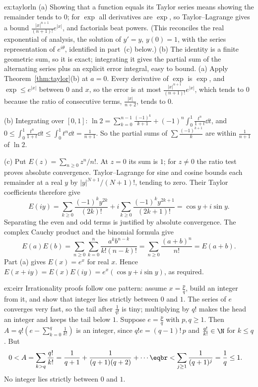 \begin{solution}{ex:taylorln}
\idea (a) Showing that a function equals its Taylor series means showing the remainder tends to $0$; for $\exp$ all derivatives are $\exp$, so Taylor--Lagrange gives a bound $\frac{|x|^{n+1}}{(n+1)!}e^{|x|}$, and factorials beat powers. (This reconciles the real exponential of analysis, the solution of $y'=y$, $y(0)=1$, with the series representation of $e^{i\theta}$, identified in part~(c) below.) (b) The identity is a finite geometric sum, so it is exact; integrating it gives the partial sum of the alternating series plus an explicit error integral, easy to bound.
\writeup (a) Apply Theorem~\ref{thm:taylor}(b) at $a=0$. Every derivative of $\exp$ is $\exp$, and $\exp\le e^{|x|}$ between $0$ and $x$, so the error is at most $\frac{|x|^{n+1}}{(n+1)!}e^{|x|}$, which tends to $0$ because the ratio of consecutive terms, $\frac{|x|}{n+2}$, tends to $0$.

(b) Integrating over $[0,1]$: $\ln2=\sum_{k=0}^{n-1}\frac{(-1)^k}{k+1}+(-1)^n\int_0^1\frac{t^n}{1+t}\dd t$, and
$0\le\int_0^1\frac{t^n}{1+t}\dd t\le\int_0^1t^n\dd t=\frac1{n+1}$. So the partial sums of $\sum\frac{(-1)^{k+1}}k$ are within $\frac1{n+1}$ of $\ln2$.

(c) Put $E(z)=\sum_{n\ge0}z^n/n!$. At $z=0$ its sum is $1$; for $z\ne0$ the ratio test proves absolute convergence.
Taylor--Lagrange for sine and cosine bounds each remainder at a real $y$ by
$|y|^{N+1}/(N+1)!$, tending to zero. Their Taylor coefficients therefore give
\[
E(iy)=\sum_{k\ge0}\frac{(-1)^k y^{2k}}{(2k)!}
+i\sum_{k\ge0}\frac{(-1)^k y^{2k+1}}{(2k+1)!}
=\cos y+i\sin y.
\]
Separating the even and odd terms is justified by absolute convergence.
The complex Cauchy product and the binomial formula give
\[
E(a)E(b)=\sum_{n\ge0}\sum_{k=0}^n
\frac{a^kb^{n-k}}{k!(n-k)!}
=\sum_{n\ge0}\frac{(a+b)^n}{n!}=E(a+b).
\]
Part (a) gives $E(x)=e^x$ for real $x$. Hence
$E(x+iy)=E(x)E(iy)=e^x(\cos y+i\sin y)$, as required.
\end{solution}

\begin{solution}{ex:eirr}
\idea Irrationality proofs follow one pattern: assume $x=\frac pq$, build an integer from it, and show that integer lies strictly between $0$ and $1$. The series of $e$ converges very fast, so the tail after $\frac1{q!}$ is tiny; multiplying by $q!$ makes the head an integer and keeps the tail below $1$.
\writeup Suppose $e=\frac pq$ with $p,q\ge1$. Then $A=q!\left(e-\sum_{k=0}^q\frac1{k!}\right)$ is an integer, since $q!e=(q-1)!\,p$ and $\frac{q!}{k!}\in\N$ for $k\le q$. But
\[
\begin{aligned}0<A&=\sum_{k>q}\frac{q!}{k!}=\frac1{q+1}+\frac1{(q+1)(q+2)}+\cdots\eqbr<\sum_{j\ge1}\frac1{(q+1)^j}=\frac1q\le1.\end{aligned}
\]
No integer lies strictly between $0$ and $1$.
\end{solution}

